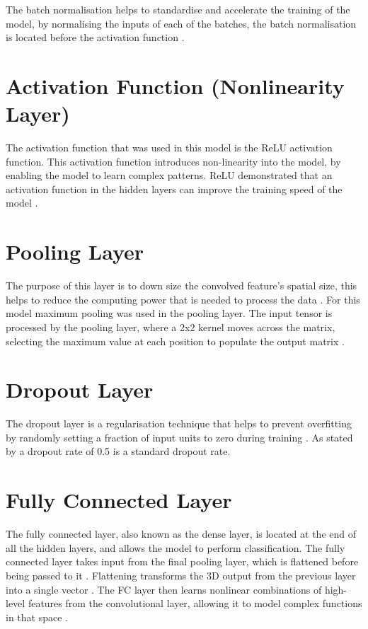 \documentclass[a4paper,oneside,11pt]{book}
\begin{document}
The batch normalisation helps to standardise and accelerate the training of the model, by normalising the inputs of each of the batches, the batch normalisation is located before the activation function \citep{kumar2021convolutional}.

\section{Activation Function (Nonlinearity Layer)}

The activation function that was used in this model is the ReLU activation function. This activation function introduces non-linearity into the model, by enabling the model to learn complex patterns. ReLU demonstrated that an activation function in the hidden layers can improve the training speed of the model \citep{ide2017improvement}.

\section{Pooling Layer}

The purpose of this layer is to down size the convolved feature's spatial size, this helps to reduce the computing power that is needed to process the data \citep{bhatt2021cnn}. For this model maximum pooling was used in the pooling layer. The input tensor is processed by the pooling layer, where a 2x2 kernel moves across the matrix, selecting the maximum value at each position to populate the output matrix \citep{bhatt2021cnn}.

\section{Dropout Layer}

The dropout layer is a regularisation technique that helps to prevent overfitting by randomly setting a fraction of input units to zero during training \citep{khan2019regularization}. As stated by \cite{khan2019regularization} a dropout rate of 0.5 is a standard dropout rate.

\section{Fully Connected Layer}

The fully connected layer, also known as the dense layer, is located at the end of all the hidden layers, and allows the model to perform classification. The fully connected layer takes input from the final pooling layer, which is flattened before being passed to it \citep{bhatt2021cnn}. Flattening transforms the 3D output from the previous layer into a single vector \citep{bhatt2021cnn}. The FC layer then learns nonlinear combinations of high-level features from the convolutional layer, allowing it to model complex functions in that space \citep{bhatt2021cnn}.
\end{document}
